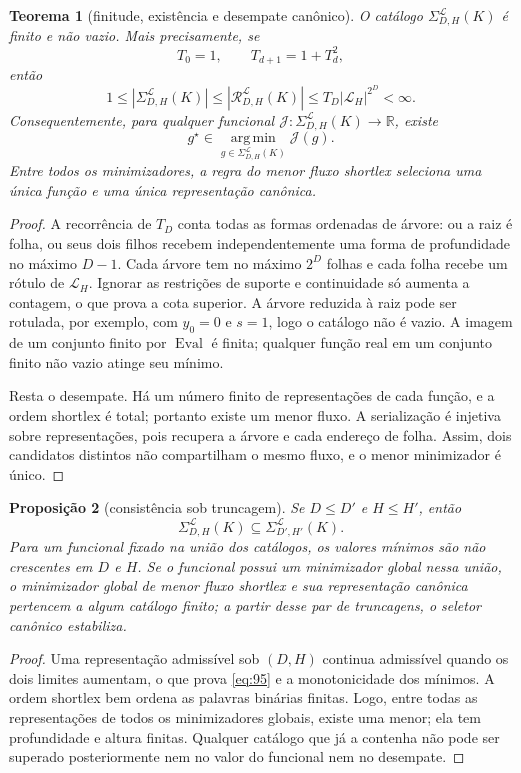 \documentclass[11pt,a4paper]{article}
\theoremstyle{preciso}
\newtheorem{teorema}{Teorema}[section]
\newtheorem{proposicao}[teorema]{Proposição}
\theoremstyle{definition}
\newcommand{\R}{\mathbb R}
\newcommand{\LL}{\mathcal L}
\newcommand{\RR}{\mathcal R}
\newcommand{\Eval}{\operatorname{Eval}}
\newcommand{\eqn}[2]{\begin{equation}\label{eq:#1}#2\end{equation}}
\begin{document}
\begin{teorema}[finitude, existência e desempate canônico]
O catálogo $\Sigma^{\LL}_{D,H}(K)$ é finito e não vazio. Mais precisamente, se
\[
T_0=1,\qquad T_{d+1}=1+T_d^2,
\]
então
\eqn{93}{1\le|\Sigma^{\LL}_{D,H}(K)|\le|\RR^{\LL}_{D,H}(K)|
\le T_D|\LL_H|^{2^D}<\infty.}
Consequentemente, para qualquer funcional $\mathcal J:\Sigma^{\LL}_{D,H}(K)\to\R$, existe
\eqn{94}{g^\star\in\operatorname*{arg\,min}_{g\in\Sigma^{\LL}_{D,H}(K)}\mathcal J(g).}
Entre todos os minimizadores, a regra do menor fluxo shortlex seleciona uma única função e uma única representação canônica.
\end{teorema}
\begin{proof}
A recorrência de $T_D$ conta todas as formas ordenadas de árvore: ou a raiz é folha, ou seus dois filhos recebem independentemente uma forma de profundidade no máximo $D-1$. Cada árvore tem no máximo $2^D$ folhas e cada folha recebe um rótulo de $\LL_H$. Ignorar as restrições de suporte e continuidade só aumenta a contagem, o que prova a cota superior. A árvore reduzida à raiz pode ser rotulada, por exemplo, com $y_0=0$ e $s=1$, logo o catálogo não é vazio. A imagem de um conjunto finito por $\Eval$ é finita; qualquer função real em um conjunto finito não vazio atinge seu mínimo.

Resta o desempate. Há um número finito de representações de cada função, e a ordem shortlex é total; portanto existe um menor fluxo. A serialização é injetiva sobre representações, pois recupera a árvore e cada endereço de folha. Assim, dois candidatos distintos não compartilham o mesmo fluxo, e o menor minimizador é único.
\end{proof}

\begin{proposicao}[consistência sob truncagem]
Se $D\le D'$ e $H\le H'$, então
\eqn{95}{\Sigma^{\LL}_{D,H}(K)\subseteq\Sigma^{\LL}_{D',H'}(K).}
Para um funcional fixado na união dos catálogos, os valores mínimos são não crescentes em $D$ e $H$. Se o funcional possui um minimizador global nessa união, o minimizador global de menor fluxo shortlex e sua representação canônica pertencem a algum catálogo finito; a partir desse par de truncagens, o seletor canônico estabiliza.
\end{proposicao}
\begin{proof}
Uma representação admissível sob $(D,H)$ continua admissível quando os dois limites aumentam, o que prova \eqref{eq:95} e a monotonicidade dos mínimos. A ordem shortlex bem ordena as palavras binárias finitas. Logo, entre todas as representações de todos os minimizadores globais, existe uma menor; ela tem profundidade e altura finitas. Qualquer catálogo que já a contenha não pode ser superado posteriormente nem no valor do funcional nem no desempate.
\end{proof}
\end{document}
